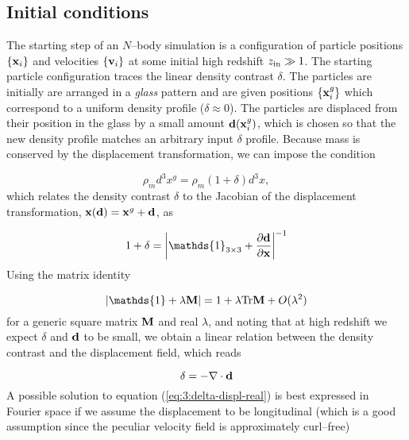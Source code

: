 \subsection{Initial conditions}
The starting step of an $N$--body simulation is a configuration of particle positions $\{\mathbf{x}_i\}$ and velocities $\{\mathbf{v}_i\}$ at some initial high redshift $z_{\rm in}\gg 1$. The starting particle configuration traces the linear density contrast $\delta$. The particles are initially are arranged in a \textit{glass} pattern and are given positions $\{\mathbf{x}_i^g\}$ which correspond to a uniform density profile ($\delta\approx0$). The particles are displaced from their position in the glass by a small amount $\mathbf{d}(\mathbf{x}_i^g)$, which is chosen so that the new density profile matches an arbitrary input $\delta$ profile. Because mass is conserved by the displacement transformation, we can impose the condition

\begin{equation}
\label{eq:3:masscons}
\rho_m d^3 x^g = \rho_m(1+\delta)d^3x,
\end{equation} 
%
which relates the density contrast $\delta$ to the Jacobian of the displacement transformation, $\mathbf{x}(\mathbf{d}) = \mathbf{x}^g+\mathbf{d}$, as 

\begin{equation}
\label{eq:3:delta-displ}
1+\delta = \left\vert\mathds{1}_{3\times 3}+\frac{\partial \bb{d}}{\partial \bb{x}}\right\vert^{-1}
\end{equation}
%
Using the matrix identity

\begin{equation}
\label{eq:3:det-identity}
\vert\mathds{1}+\lambda\bb{M}\vert = 1 + \lambda\Tr\bb{M} + O(\lambda^2)
\end{equation}
%
for a generic square matrix $\mathbf{M}$ and real $\lambda$, and noting that at high redshift we expect $\delta$ and $\mathbf{d}$ to be small, we obtain a linear relation between the density contrast and the displacement field, which reads 

\begin{equation}
\label{eq:3:delta-displ-real}
\delta = -\nabla\cdot\mathbf{d}
\end{equation}
%
A possible solution to equation (\ref{eq:3:delta-displ-real}) is best expressed in Fourier space if we assume the displacement to be longitudinal (which is a good assumption since the peculiar velocity field is approximately curl--free)

